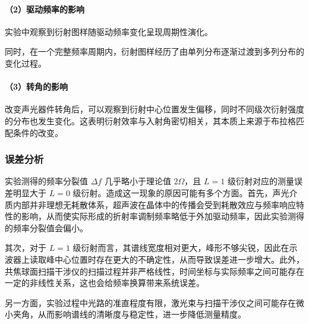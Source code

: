 \documentclass[a4paper]{ctexart}
\begin{document}
\vspace{0.5em}

\paragraph{（2）驱动频率的影响}

实验中观察到衍射图样随驱动频率变化呈现周期性演化。




同时，在一个完整频率周期内，衍射图样经历了由单列分布逐渐过渡到多列分布的变化过程。



\vspace{0.5em}

\paragraph{（3）转角的影响}

改变声光器件转角后，可以观察到衍射中心位置发生偏移，同时不同级次衍射强度的分布也发生变化。这表明衍射效率与入射角密切相关，其本质上来源于布拉格匹配条件的改变。

\subsubsection*{误差分析}

实验测得的频率分裂值 $\Delta f$ 几乎略小于理论值 $2\Omega$，且 $L=1$ 级衍射对应的测量误差明显大于 $L=0$ 级衍射。造成这一现象的原因可能有多个方面。首先，声光介质内部并非理想无耗散体系，超声波在晶体中的传播会受到耗散效应与频率响应特性的影响，从而使实际形成的折射率调制频率略低于外加驱动频率，因此实验测得的频率分裂值会偏小。

其次，对于 $L=1$ 级衍射而言，其谱线宽度相对更大，峰形不够尖锐，因此在示波器上读取峰中心位置时存在更大的不确定性，从而导致误差进一步增大。此外，共焦球面扫描干涉仪的扫描过程并非严格线性，时间坐标与实际频率之间可能存在一定的非线性关系，这也会给频率换算带来系统误差。

另一方面，实验过程中光路的准直程度有限，激光束与扫描干涉仪之间可能存在微小夹角，从而影响谱线的清晰度与稳定性，进一步降低测量精度。
\end{document}
